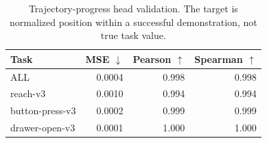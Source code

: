 \begin{table}[t]
\centering
\caption{Trajectory-progress head validation. The target is normalized position within a successful demonstration, not true task value.}
\label{tab:progress-head-validation}
\begin{tabular}{lrrr}
\toprule
Task & MSE $\downarrow$ & Pearson $\uparrow$ & Spearman $\uparrow$ \\
\midrule
ALL & 0.0004 & 0.998 & 0.998 \\
reach-v3 & 0.0010 & 0.994 & 0.994 \\
button-press-v3 & 0.0002 & 0.999 & 0.999 \\
drawer-open-v3 & 0.0001 & 1.000 & 1.000 \\
\bottomrule
\end{tabular}
\end{table}

